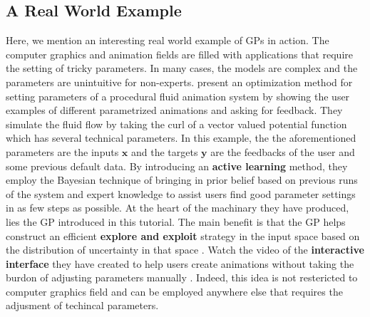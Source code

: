 \documentclass[10pt]{article}
\theoremstyle{definition}
\begin{document}
\subsection{A Real World Example}
Here, we mention an interesting real world example of GPs in action. The computer graphics and animation fields are filled with applications that require the setting of tricky parameters. In many cases, the models are complex and the parameters are unintuitive for non-experts. \citeauthor{Brochu2010} \cite{Brochu2010} present an optimization method for setting parameters of a procedural fluid animation system by showing the user examples of different parametrized animations and asking for feedback. They simulate the fluid flow by taking the curl of a vector valued potential function which has several technical parameters. In this example, the the aforementioned parameters are the inputs $\mathbf{x}$ and the targets $\mathbf{y}$ are the feedbacks of the user and some previous default data. By introducing an \textbf{active learning} method, they employ the Bayesian technique of bringing in prior belief based on previous runs of the system and expert knowledge to assist users find good parameter settings in as few steps as possible. At the heart of the machinary they have produced, lies the GP introduced in this tutorial. The main benefit is that the GP helps construct an efficient \textbf{explore and exploit} strategy in the input space based on the distribution of uncertainty in that space \cite[Lecture 9]{Freitas2013}. Watch the video of the \textbf{interactive interface} they have created to help users create animations without taking the burdon of adjusting parameters manually \cite{Brochu2010Animation}. Indeed, this idea is not restericted to computer graphics field and can be employed anywhere else that requires the adjusment of techincal parameters.
\end{document}
